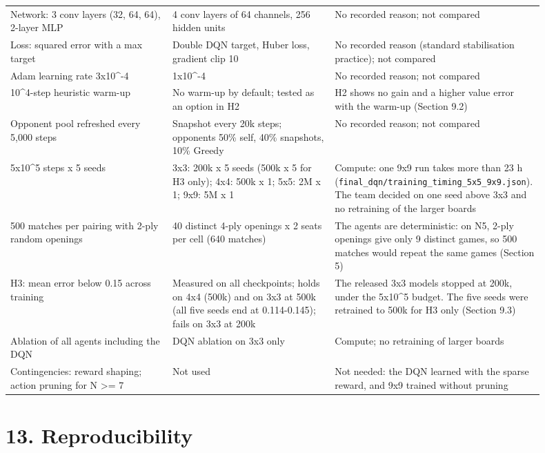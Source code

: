 \documentclass[11pt]{article}
\begin{document}
\begin{center}
\begin{longtable}{p{0.30\linewidth}p{0.30\linewidth}p{0.30\linewidth}}
Network: 3 conv layers (32, 64, 64), 2-layer MLP & 4 conv layers of 64 channels, 256 hidden units & No recorded reason; not compared \\
Loss: squared error with a max target & Double DQN target, Huber loss, gradient clip 10 & No recorded reason (standard stabilisation practice); not compared \\
Adam learning rate 3x10\textasciicircum{}-4 & 1x10\textasciicircum{}-4 & No recorded reason; not compared \\
10\textasciicircum{}4-step heuristic warm-up & No warm-up by default; tested as an option in H2 & H2 shows no gain and a higher value error with the warm-up (Section 9.2) \\
Opponent pool refreshed every 5,000 steps & Snapshot every 20k steps; opponents 50\% self, 40\% snapshots, 10\% Greedy & No recorded reason; not compared \\
5x10\textasciicircum{}5 steps x 5 seeds & 3x3: 200k x 5 seeds (500k x 5 for H3 only); 4x4: 500k x 1; 5x5: 2M x 1; 9x9: 5M x 1 & Compute: one 9x9 run takes more than 23 h (\texttt{final\_dqn/training\_timing\_5x5\_9x9.json}). The team decided on one seed above 3x3 and no retraining of the larger boards \\
500 matches per pairing with 2-ply random openings & 40 distinct 4-ply openings x 2 seats per cell (640 matches) & The agents are deterministic: on N5, 2-ply openings give only 9 distinct games, so 500 matches would repeat the same games (Section 5) \\
H3: mean error below 0.15 across training & Measured on all checkpoints; holds on 4x4 (500k) and on 3x3 at 500k (all five seeds end at 0.114-0.145); fails on 3x3 at 200k & The released 3x3 models stopped at 200k, under the 5x10\textasciicircum{}5 budget. The five seeds were retrained to 500k for H3 only (Section 9.3) \\
Ablation of all agents including the DQN & DQN ablation on 3x3 only & Compute; no retraining of larger boards \\
Contingencies: reward shaping; action pruning for N >= 7 & Not used & Not needed: the DQN learned with the sparse reward, and 9x9 trained without pruning \\
\bottomrule
\end{longtable}
\end{center}

\section{13. Reproducibility}
\end{document}
